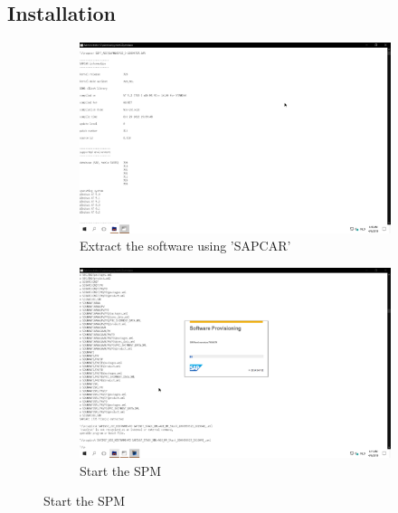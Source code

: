 \subsection{Installation}
\begin{figure}[!htb]
    \begin{subfigure}{0.5\textwidth}
        \captionsetup{width=0.8\linewidth}
        \includegraphics[width=0.9\linewidth]{img/Methodologie/SAP38.png}
        \centering
        \caption{Extract the software using 'SAPCAR'}
    \end{subfigure}
    \begin{subfigure}{0.5\textwidth}
        \captionsetup{width=0.8\linewidth}
        \includegraphics[width=0.9\linewidth]{img/Methodologie/SAP37.png} 
        \centering
        \caption{Start the SPM}
    \end{subfigure}
\end{figure}
